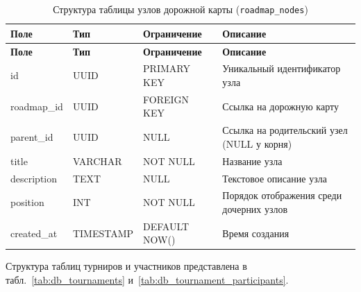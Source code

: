 \begin{longtable}{|l|l|p{3.5cm}|p{5.5cm}|}
	\caption{Структура таблицы узлов дорожной карты (\texttt{roadmap\_nodes})} \label{tab:db_roadmap_nodes} \\

	\hline
	\textbf{Поле}    & \textbf{Тип}  & \textbf{Ограничение} & \textbf{Описание}                        \\ \hline
	\endfirsthead

	\tabcont{\ref{tab:db_roadmap_nodes}}
	\textbf{Поле}    & \textbf{Тип}  & \textbf{Ограничение} & \textbf{Описание}                        \\ \hline
	\endhead

	\hline
	\endfoot

	\hline
	\endlastfoot

	id               & UUID          & PRIMARY KEY          & Уникальный идентификатор узла            \\ \hline
	roadmap\_id      & UUID          & FOREIGN KEY          & Ссылка на дорожную карту                 \\ \hline
	parent\_id       & UUID          & NULL                 & Ссылка на родительский узел (NULL у корня) \\ \hline
	title            & VARCHAR       & NOT NULL             & Название узла                            \\ \hline
	description      & TEXT          & NULL                 & Текстовое описание узла                  \\ \hline
	position         & INT           & NOT NULL             & Порядок отображения среди дочерних узлов \\ \hline
	created\_at      & TIMESTAMP     & DEFAULT NOW()        & Время создания                           \\ \hline
\end{longtable}

Структура таблиц турниров и участников представлена
в табл.~\ref{tab:db_tournaments} и~\ref{tab:db_tournament_participants}.

